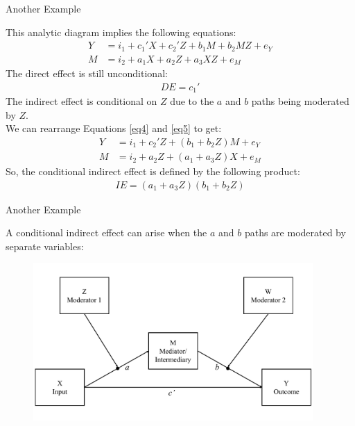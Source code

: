 \documentclass{beamer}
\newcommand{\va}[0]{\vspace{12pt}}
\newcommand{\vb}[0]{\vspace{6pt}}
\begin{document}
\begin{frame}{Another Example}
  
  This analytic diagram implies the following equations:
  \begin{align}
    Y &= i_1 + c_1'X + c_2'Z + b_1M + b_2MZ + e_Y \label{eq4}\\
    M &= i_2 + a_1X + a_2Z + a_3XZ + e_M \label{eq5}
  \end{align}
  \pause
  The direct effect is still unconditional:
  \begin{align*}
    DE = c_1'
  \end{align*}
  \pause 
  The indirect effect is conditional on $Z$ due to the
  $a$ and $b$ paths being moderated by $Z$.\\ 
  \va 
  \pause 
  We can rearrange Equations \ref{eq4} and \ref{eq5} to get:
  \begin{align*}
    Y &= i_1 + c_2'Z + \left( b_1 + b_2Z \right)M + e_Y\\
    M &= i_2 + a_2Z + \left( a_1 + a_3Z \right)X + e_M
  \end{align*}
  So, the conditional indirect effect is defined by the following
  product:
  \begin{align*}
    IE = \left(a_1 + a_3Z \right) \left(b_1 + b_2Z \right)
  \end{align*}
  
\end{frame}



\begin{frame}{Another Example}
  
  A conditional indirect effect can arise when the $a$ and $b$ paths
  are moderated by separate variables: 
  \vb
  \begin{figure}
    \includegraphics[width=0.95\textwidth]{figures/modAwithZ_BwithWConceptual.pdf}
  \end{figure}
  
\end{frame}
\end{document}
